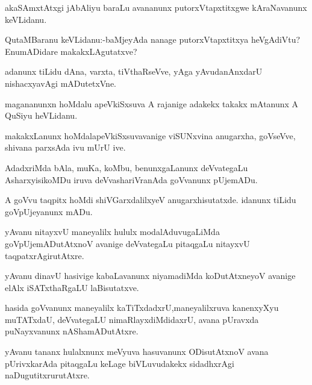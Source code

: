 \documentclass{article}
\begin{document}
\begin{mn}%
akaSAmxtAtxgi jAbAliyu baraLu avananunx putorxVtapxtitxgwe kAraNavanunx keVLidanu. 
\end{mn}

\begin{mn}%
QutaMBaranu keVLidanu:-baMjeyAda nanage putorxVtapxtitxya heVgAdiVtu? EnumADidare 
makakxLAgutatxve?
\end{mn}

\begin{mn}%
adanunx tiLidu dAna, varxta, tiVthaRseVve, yAga  yAvudanAnxdarU nishacxyavAgi mADutetxVne.
\end{mn}

\begin{mn}%
magananunxn hoMdalu apeVkiSxsuva A rajanige adakekx takakx mAtanunx A QuSiyu heVLidanu.
\end{mn}

\begin{mn}%
makakxLanunx hoMdalapeVkiSxsuvavanige viSUNxvina anugarxha, goVseVve, shivana parxsAda ivu 
mUrU ive.
\end{mn}

\begin{mn}%
AdadxriMda bAla, muKa, koMbu, benunxgaLanunx deVvategaLu AsharxyisikoMDu iruva 
deVvashariVranAda goVvanunx pUjemADu.
\end{mn}

\begin{mn}%
A goVvu taqpitx hoMdi shiVGarxdalilxyeV anugarxhisutatxde. idanunx tiLidu goVpUjeyanunx mADu.
\end{mn}

\begin{mn}%
yAvanu nitayxvU maneyalilx hululx modalAduvugaLiMda goVpUjemADutAtxnoV avanige deVvategaLu 
pitaqgaLu nitayxvU taqpatxrAgirutAtxre.
\end{mn}

\begin{mn}%
yAvanu dinavU hasivige kabaLavanunx niyamadiMda koDutAtxneyoV avanige elAlx iSATxthaRgaLU 
laBisutatxve.
\end{mn}

\begin{mn}%
hasida goVvanunx maneyalilx kaTiTxdadxrU,maneyalilxruva kanenxyXyu muTATxdaU, deVvategaLU 
nimaRlayxdiMdidaxrU, avana pUravxda puNayxvanunx nAShamADutAtxre.
\end{mn}

\begin{mn}%
yAvanu tananx hulalxnunx meVyuva hasuvanunx ODisutAtxnoV avana pUrivxkarAda pitaqgaLu 
keLage biVLuvudakekx sidadhxrAgi naDugutitxrurutAtxre.
\end{mn}
\end{document}
